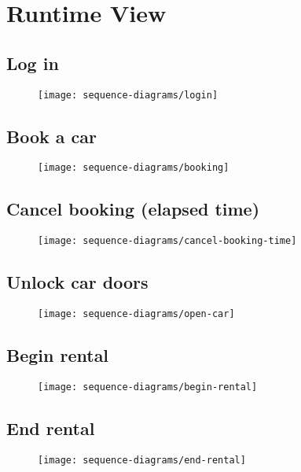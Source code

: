 \section{Runtime View}

\subsection*{Log in}
\begin{figure}[H]
	\centering
	\texttt{[image: sequence-diagrams/login]}
	\caption[Runtime View - Log in]{}
	\label{fig:login}
\end{figure}

\subsection*{Book a car}
\begin{figure}[H]
	\centering
	\texttt{[image: sequence-diagrams/booking]}
	\caption[Runtime View - Book a car]{}
	\label{fig:booking}
\end{figure}

\subsection*{Cancel booking (elapsed time)}
\begin{figure}[H]
	\centering
	\texttt{[image: sequence-diagrams/cancel-booking-time]}
	\caption[Runtime View - Cancel booking (elapsed time)]{}
	\label{fig:cancel-booking-time}
\end{figure}

\subsection*{Unlock car doors}
\begin{figure}[H]
	\centering
	\texttt{[image: sequence-diagrams/open-car]}
	\caption[Runtime View - Unlock car doors]{}
	\label{fig:open-car}
\end{figure}

\subsection*{Begin rental}
\begin{figure}[H]
	\centering
	\texttt{[image: sequence-diagrams/begin-rental]}
	\caption[Runtime View - Begin rental]{}
	\label{fig:begin-rental}
\end{figure}

\subsection*{End rental}
\begin{figure}[H]
	\centering
	\texttt{[image: sequence-diagrams/end-rental]}
	\caption[Runtime View - End rental]{}
	\label{fig:end-rental}
\end{figure}